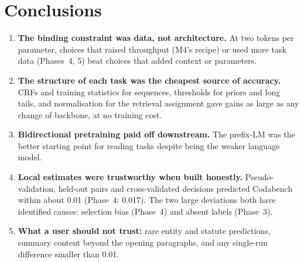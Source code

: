 \documentclass[11pt, oneside]{article}
\begin{document}
\section{Conclusions}
\begin{enumerate}[leftmargin=*, itemsep=2pt]
\item \textbf{The binding constraint was data, not architecture.} At two tokens per parameter, choices that raised
throughput (M4's recipe) or used more task data (Phases~4, 5) beat choices that added context or parameters.
\item \textbf{The structure of each task was the cheapest source of accuracy.} CRFs and training statistics for
sequences, thresholds for priors and long tails, and normalisation for the retrieval assignment gave gains as large as
any change of backbone, at no training cost.
\item \textbf{Bidirectional pretraining paid off downstream.} The prefix-LM was the better starting point for reading
tasks despite being the weaker language model.
\item \textbf{Local estimates were trustworthy when built honestly.} Pseudo-validation, held-out pairs and
cross-validated decisions predicted Codabench within about 0.01 (Phase~4: 0.017). The two large deviations both have identified
causes: selection bias (Phase~4) and absent labels (Phase~3).
\item \textbf{What a user should not trust:} rare entity and statute predictions, summary content beyond the opening
paragraphs, and any single-run difference smaller than 0.01.
\end{enumerate}
\end{document}
